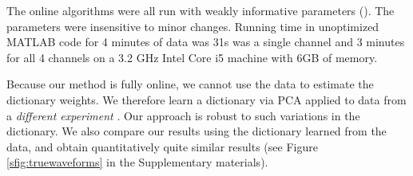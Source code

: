The online algorithms were all run with weakly informative parameters (). The parameters were insensitive to minor changes.  Running time in unoptimized MATLAB code for 4 minutes of data was 31s was a single channel and 3 minutes for all 4 channels on a 3.2 GHz Intel Core i5 machine with 6GB of memory.

Because our method is fully online, we cannot use the data to estimate the dictionary weights. We therefore learn a dictionary via PCA applied to data from a \emph{different experiment} .  Our approach is robust to such variations in the dictionary.  We also compare our results using the dictionary learned from the data, and obtain quantitatively quite similar results (see Figure \ref{sfig:truewaveforms} in the Supplementary materials).

